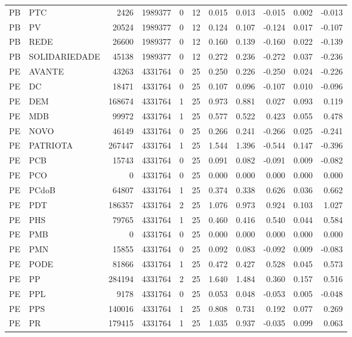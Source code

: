 \begin{landscape}
\begin{longtable}{llrrrrrrrrr}
PB & PTC & 2426 & 1989377 & 0 & 12 & 0.015 & 0.013 & -0.015 & 0.002 & -0.013 \\
PB & PV & 20524 & 1989377 & 0 & 12 & 0.124 & 0.107 & -0.124 & 0.017 & -0.107 \\
PB & REDE & 26600 & 1989377 & 0 & 12 & 0.160 & 0.139 & -0.160 & 0.022 & -0.139 \\
PB & SOLIDARIEDADE & 45138 & 1989377 & 0 & 12 & 0.272 & 0.236 & -0.272 & 0.037 & -0.236 \\
PE & AVANTE & 43263 & 4331764 & 0 & 25 & 0.250 & 0.226 & -0.250 & 0.024 & -0.226 \\
PE & DC & 18471 & 4331764 & 0 & 25 & 0.107 & 0.096 & -0.107 & 0.010 & -0.096 \\
PE & DEM & 168674 & 4331764 & 1 & 25 & 0.973 & 0.881 & 0.027 & 0.093 & 0.119 \\
PE & MDB & 99972 & 4331764 & 1 & 25 & 0.577 & 0.522 & 0.423 & 0.055 & 0.478 \\
PE & NOVO & 46149 & 4331764 & 0 & 25 & 0.266 & 0.241 & -0.266 & 0.025 & -0.241 \\
PE & PATRIOTA & 267447 & 4331764 & 1 & 25 & 1.544 & 1.396 & -0.544 & 0.147 & -0.396 \\
PE & PCB & 15743 & 4331764 & 0 & 25 & 0.091 & 0.082 & -0.091 & 0.009 & -0.082 \\
PE & PCO & 0 & 4331764 & 0 & 25 & 0.000 & 0.000 & 0.000 & 0.000 & 0.000 \\
PE & PCdoB & 64807 & 4331764 & 1 & 25 & 0.374 & 0.338 & 0.626 & 0.036 & 0.662 \\
PE & PDT & 186357 & 4331764 & 2 & 25 & 1.076 & 0.973 & 0.924 & 0.103 & 1.027 \\
PE & PHS & 79765 & 4331764 & 1 & 25 & 0.460 & 0.416 & 0.540 & 0.044 & 0.584 \\
PE & PMB & 0 & 4331764 & 0 & 25 & 0.000 & 0.000 & 0.000 & 0.000 & 0.000 \\
PE & PMN & 15855 & 4331764 & 0 & 25 & 0.092 & 0.083 & -0.092 & 0.009 & -0.083 \\
PE & PODE & 81866 & 4331764 & 1 & 25 & 0.472 & 0.427 & 0.528 & 0.045 & 0.573 \\
PE & PP & 284194 & 4331764 & 2 & 25 & 1.640 & 1.484 & 0.360 & 0.157 & 0.516 \\
PE & PPL & 9178 & 4331764 & 0 & 25 & 0.053 & 0.048 & -0.053 & 0.005 & -0.048 \\
PE & PPS & 140016 & 4331764 & 1 & 25 & 0.808 & 0.731 & 0.192 & 0.077 & 0.269 \\
PE & PR & 179415 & 4331764 & 1 & 25 & 1.035 & 0.937 & -0.035 & 0.099 & 0.063 \\

\end{longtable}
\end{landscape}
